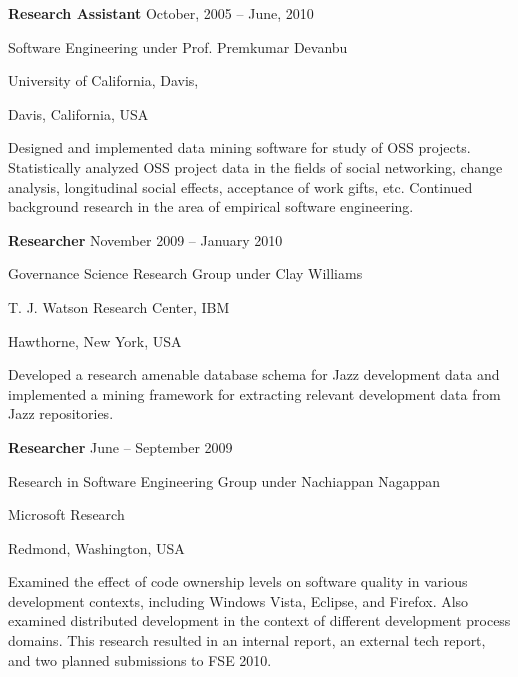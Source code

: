 \documentclass[margin,line,article,letterpaper]{res}
\newenvironment{list1}{
  \begin{list}{}{%
      \setlength{\itemsep}{0in}
      \setlength{\parsep}{0in} \setlength{\parskip}{0in}
      \setlength{\topsep}{0in} \setlength{\partopsep}{0in} 
      \setlength{\leftmargin}{0.17in}}}{\end{list}}
\newcommand{\timespan}[1]{#1}
\begin{document}
\begin{resume}
\textbf{Research Assistant} \hfill \timespan{October, 2005 -- June, 2010}\\
\vspace{-10pt}
\begin{list1}
\item Software Engineering under Prof. Premkumar Devanbu
\item University of California, Davis,
\item Davis, California, USA
\vspace{6pt}
\item Designed and implemented data mining software for study of OSS projects. Statistically 
analyzed OSS project data in the fields of social networking, change analysis, 
longitudinal social effects, acceptance of work gifts, etc. Continued background research in the 
area of empirical software engineering.
\end{list1}

\textbf{Researcher} \hfill \timespan{November 2009 -- January 2010}\\
\vspace{-10pt}
\begin{list1}
\item Governance Science Research Group under Clay Williams
\item T. J. Watson Research Center, IBM
\item Hawthorne, New York, USA
\vspace{6pt}
\item Developed a research amenable database schema for Jazz development
    data and implemented a mining framework for extracting relevant development
    data from Jazz repositories.
\end{list1}


\textbf{Researcher} \hfill \timespan{June -- September 2009}\\
\vspace{-10pt}
\begin{list1}
\item Research in Software Engineering Group under Nachiappan Nagappan
\item Microsoft Research
\item Redmond, Washington, USA
\vspace{6pt}
\item Examined the effect of code ownership levels on software quality in various
	development contexts, including Windows Vista, Eclipse, and Firefox.  Also
	examined distributed development in the context of different development
	process domains.  This research resulted in an internal report, an external
	tech report, and two planned submissions to FSE 2010.
\end{list1}


\end{resume}
\end{document}
